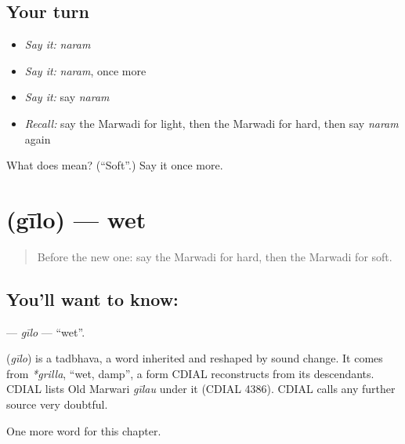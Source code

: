 \subsection*{Your turn}
\begin{itemize}
\raggedright
  \item \emph{Say it:} \emph{naram}
  \item \emph{Say it:} \emph{naram}, once more
  \item \emph{Say it:} say \emph{naram}
  \item \emph{Recall:} say the Marwadi for light, then the Marwadi for hard, then say \emph{naram} again
\end{itemize}

\begin{tcolorbox}[breakable,colback=teal!4,colframe=teal!35!black,title={Before you move on}]
What does  mean? (\textquotedblleft{}Soft\textquotedblright{}.) Say it once more.
\end{tcolorbox}
\section[\texorpdfstring{\mw{गीलो} (gīlo)}{गीलो (gīlo)}]{ (gīlo) — wet}

\label{lesson:MW-C142-gilo}



\begin{quote}
Before the new one: say the Marwadi for hard, then the Marwadi for soft.
\end{quote}

\subsection*{You'll want to know: }
\textbf{} — \emph{gīlo} — \textquotedblleft{}wet\textquotedblright{}.

\begin{cousinweb}
\textbf{} (\emph{gīlo}) is a tadbhava, a word inherited and reshaped by sound change. It comes from \emph{*grilla}, \textquotedblleft{}wet, damp\textquotedblright{}, a form CDIAL reconstructs from its descendants. CDIAL lists Old Marwari \emph{gīlau} under it (CDIAL 4386). CDIAL calls any further source very doubtful.
\end{cousinweb}

\begin{grammarlens}[title={What you've built}]
One more word for this chapter.
\end{grammarlens}

